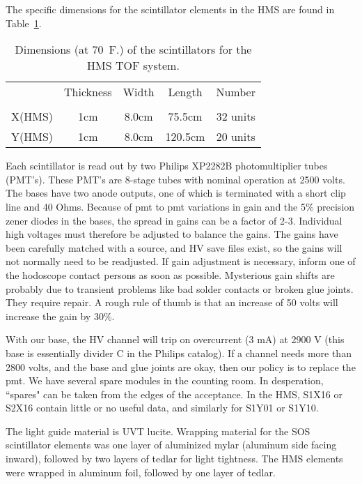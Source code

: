 	The specific dimensions for the scintillator elements in the HMS
are found in Table~\ref{tab:tof_scintillators}.
\begin{table}
\caption{Dimensions (at 70~F.) of the scintillators for the HMS TOF system.
\label{tab:tof_scintillators}}
\begin{center}
  \begin{tabular}{ccccc}
	&Thickness	&Width		&Length		&Number	\\
	&		&		&		&	\\
\hline
X(HMS)	&	1cm	&	8.0cm	&	75.5cm	&32 units\\
Y(HMS)	&	1cm	&	8.0cm	&	120.5cm	&20 units\\
  \end{tabular}
\end{center}
\end{table}
Each scintillator is read out by two Philips XP2282B photomultiplier
tubes (PMT's). These PMT's are 8-stage tubes with nominal operation at
2500 volts. The bases have two anode outputs, one of which is terminated with a
short clip line and 40 Ohms.  Because of pmt to pmt variations in gain and the
5\% precision zener diodes in the bases, the spread in gains can be a factor of
2-3. Individual high voltages must therefore be adjusted to balance the gains.
The gains have been carefully matched with a source, and HV save files exist,
so the gains will not normally need to be readjusted. If gain adjustment is
necessary, inform one of the hodoscope contact persons as soon as possible.
Mysterious gain shifts are probably due to transient problems like bad solder
contacts or broken glue joints. They require repair. A rough rule of thumb is
that an increase of 50 volts will increase the gain by 30\%.

With our base, the HV channel will trip on overcurrent (3 mA) at 2900 V
(this base is essentially divider C in the Philips catalog). If a channel needs
more than 2800 volts, and the base and glue joints are okay, then our policy
is to replace the pmt. We have several spare modules in the counting room.
In desperation, ``spares" can be taken from the edges of the acceptance. In the
HMS, S1X16 or S2X16 contain little or no useful data, and similarly for S1Y01
or S1Y10.

	The light guide material is UVT lucite.  Wrapping material for the SOS scintillator elements was one layer of
aluminized mylar (aluminum side facing inward), followed by two layers of
tedlar for light tightness. The HMS elements were wrapped in aluminum foil,
followed by one layer of tedlar.

